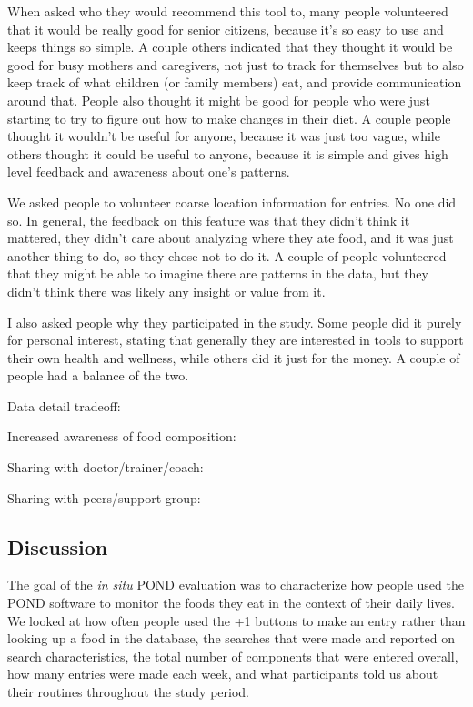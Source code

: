 When asked who they would recommend this tool to, many people volunteered that it would be really good for senior citizens, because it's so easy to use and keeps things so simple. A couple others indicated that they thought it would be good for busy mothers and caregivers, not just to track for themselves but to also keep track of what children (or family members) eat, and provide communication around that. People also thought it might be good for people who were just starting to try to figure out how to make changes in their diet. A couple people thought it wouldn't be useful for anyone, because it was just too vague, while others thought it could be useful to anyone, because it is simple and gives high level feedback and awareness about one's patterns. 

We asked people to volunteer coarse location information for entries. No one did so. In general, the feedback on this feature was that they didn't think it mattered, they didn't care about analyzing where they ate food, and it was just another thing to do, so they chose not to do it. A couple of people volunteered that they might be able to imagine there are patterns in the data, but they didn't think there was likely any insight or value from it. 

I also asked people why they participated in the study. Some people did it purely for personal interest, stating that generally they are interested in tools to support their own health and wellness, while others did it just for the money. A couple of people had a balance of the two. 

Data detail tradeoff: 

\begin{itemize*}
\item Increased awareness of food composition: 
\item Sharing with doctor/trainer/coach: 
\item Sharing with peers/support group: 
\end{itemize*}

\subsection{Discussion}
The goal of the \textit{in situ} POND evaluation was to characterize how people used the POND software to monitor the foods they eat in the context of their daily lives. We looked at how often people used the +1 buttons to make an entry rather than looking up a food in the database, the searches that were made and reported on search characteristics, the total number of components that were entered overall, how many entries were made each week, and what participants told us about their routines throughout the study period. 

